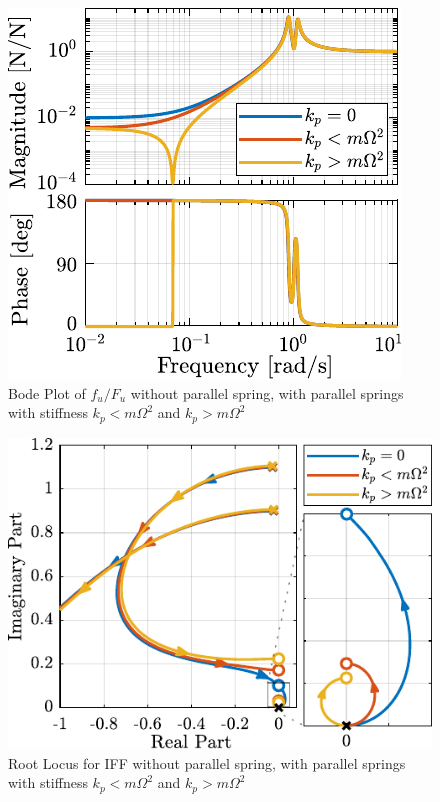 \documentclass{ISMA_USD2020}
\begin{document}
\begin{figure}[htbp]
\centering
\includegraphics[scale=1]{figs/plant_iff_kp.pdf}
\caption{\label{fig:plant_iff_kp}Bode Plot of \(f_u/F_u\) without parallel spring, with parallel springs with stiffness \(k_p < m \Omega^2\) and \(k_p > m \Omega^2\)}
\end{figure}

\begin{figure}[htbp]
\centering
\includegraphics[scale=1]{figs/root_locus_iff_kp.pdf}
\caption{\label{fig:root_locus_iff_kp}Root Locus for IFF without parallel spring, with parallel springs with stiffness \(k_p < m \Omega^2\) and \(k_p > m \Omega^2\)}
\end{figure}
\end{document}
